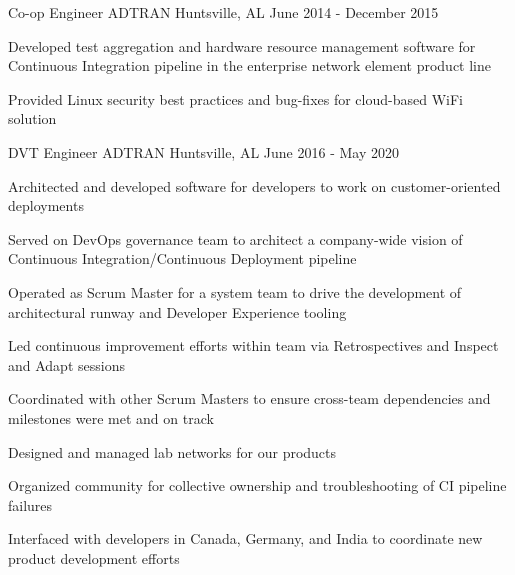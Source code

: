 
\begin{cventries}
  \cventry
    {Co-op Engineer} %
    {ADTRAN} %
    {Huntsville, AL} %
    {June 2014 - December 2015} %
    {
      \begin{cvitems} %
        \item {Developed test aggregation and hardware resource management software for Continuous Integration pipeline in the enterprise network element product line}
        \item {Provided Linux security best practices and bug-fixes for cloud-based WiFi solution}
      \end{cvitems}
    }

  \cventry
    {DVT Engineer} %
    {ADTRAN} %
    {Huntsville, AL} %
    {June 2016 - May 2020} %
    {
      \begin{cvitems} %
        \item {Architected and developed software for developers to work on customer-oriented deployments}
        \item {Served on DevOps governance team to architect a company-wide vision of Continuous Integration/Continuous Deployment pipeline}
        \item {Operated as Scrum Master for a system team to drive the development of architectural runway and Developer Experience tooling}
        \item {Led continuous improvement efforts within team via Retrospectives and Inspect and Adapt sessions}
        \item {Coordinated with other Scrum Masters to ensure cross-team dependencies and milestones were met and on track}
        \item {Designed and managed lab networks for our products}
        \item {Organized community for collective ownership and troubleshooting of CI pipeline failures}
        \item {Interfaced with developers in Canada, Germany, and India to coordinate new product development efforts}
      \end{cvitems}
    }

\end{cventries}
